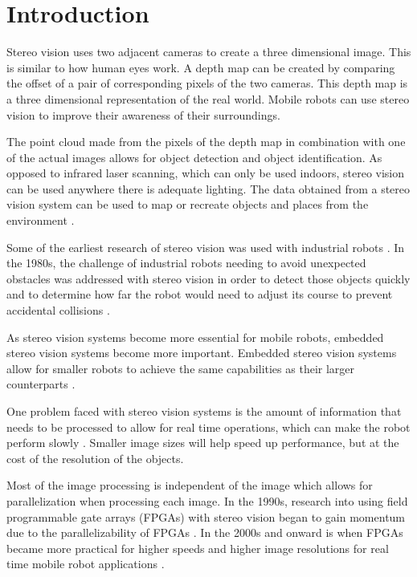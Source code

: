 \chapter{Introduction}
\label{sec:intro}

Stereo vision uses two adjacent cameras to create a three dimensional image. This is similar to how human eyes work. A depth map can be created by comparing the offset of a pair of corresponding pixels of the two cameras. This depth map is a three dimensional representation of the real world. Mobile robots can use stereo vision to improve their awareness of their surroundings.

The point cloud made from the pixels of the depth map in combination with one of the actual images allows for object detection and object identification. As opposed to infrared laser scanning, which can only be used indoors, stereo vision can be used anywhere there is adequate lighting. The data obtained from a stereo vision system can be used to map or recreate objects and places from the environment \cite{actStereoMap}.

Some of the earliest research of stereo vision was used with industrial robots \cite{industRobot}. In the 1980s, the challenge of industrial robots needing to avoid unexpected obstacles was addressed with stereo vision in order to detect those objects quickly and to determine how far the robot would need to adjust its course to prevent accidental collisions \cite{3DVision}.

As stereo vision systems become more essential for mobile robots, embedded stereo vision systems become more important. Embedded stereo vision systems allow for smaller robots to achieve the same capabilities as their larger counterparts \cite{xilinxSpartan3ABoard}.

One problem faced with stereo vision systems is the amount of information that needs to be processed to allow for real time operations, which can make the robot perform slowly \cite{nav}. Smaller image sizes will help speed up performance, but at the cost of the resolution of the objects. 

Most of the image processing is independent of the image which allows for parallelization when processing each image. In the 1990s, research into using field programmable gate arrays (FPGAs) with stereo vision began to gain momentum due to the parallelizability of FPGAs \cite{stereoFPGA}. In the 2000s and onward is when FPGAs became more practical for higher speeds and higher image resolutions for real time mobile robot applications \cite{fpga}.

